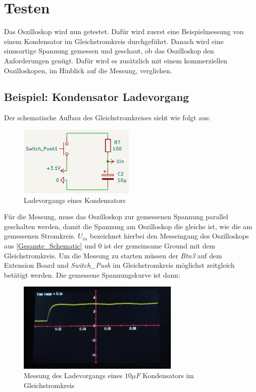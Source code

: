 \section{Testen}
\label{Beispiel-Nutzung}

Das Oszilloskop wird nun getestet.
Dafür wird zuerst eine Beispielmessung von einem Kondensator im Gleichstromkreis durchgeführt. \newline
Danach wird eine sinusartige Spannung gemessen und geschaut, ob das Oszilloskop den Anforderungen genügt.
Dafür wird es zusätzlich mit einem kommerziellen Oszilloskopen, im Hinblick auf die Messung, verglichen.

\subsection{Beispiel: Kondensator Ladevorgang}
\label{Kondensator Ladevorgang}
Der schematische Aufbau des Gleichstromkreises sieht wie folgt aus:
\begin{figure}[h]
	\centering
	\includegraphics[width=0.5\textwidth]{images/schematic_beispielnutzung_kondensator2.png}
	\caption{Ladevorgangs eines Kondensators}
\end{figure}
\newline
Für die Messung, muss das Oszilloskop zur gemessenen Spannung parallel geschalten werden,
damit die Spannung am Oszilloskop die gleiche ist, wie die am gemessenen Stromkreis.
$U_{in}$ bezeichnet hierbei den Messeingang des Oszilloskops aus \ref{Gesamte_Schematic}
und $0$ ist der gemeinsame Ground mit dem Gleichstromkreis.
Um die Messung zu starten müssen der \textit{Btn3} auf dem Extension Board und \textit{Switch\_Push}
im Gleichstromkreis möglichst zeitgleich betätigt werden.
Die gemessene Spannungskurve ist dann:
\begin{figure}[h]
	\centering
	\includegraphics[width=0.7\textwidth]{images/messung_kondensator_ladekurve_selbstgebaut.jpg}
	\caption{Messung des Ladevorgangs eines $10\mu F$ Kondensators im Gleichstromkreis}
\end{figure}
